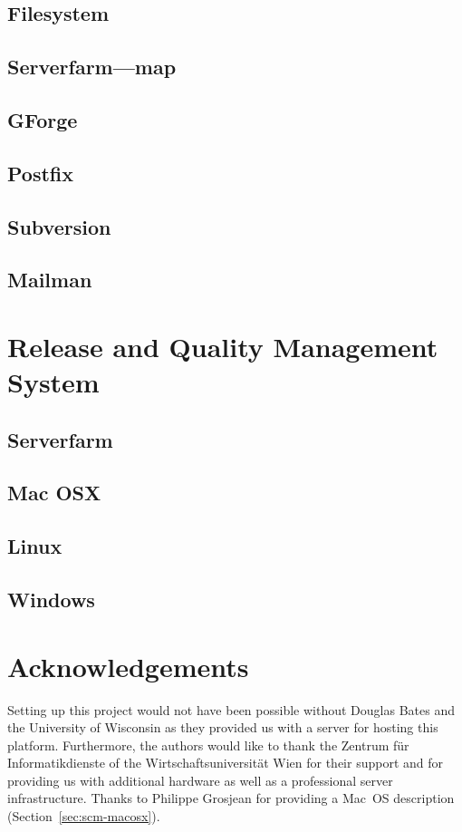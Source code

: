 \documentclass[a4paper]{article}
\begin{document}
\subsection{Filesystem}
\subsection{Serverfarm---map}
\subsection{GForge}
\subsection{Postfix}
\subsection{Subversion}
\subsection{Mailman}

\section{Release and Quality Management System}
\label{sec:release_and_QM}

\subsection{Serverfarm}
\subsection{Mac OSX}
\subsection{Linux}
\subsection{Windows}


\section{Acknowledgements}

Setting up this project would not have been possible without Douglas
Bates and the University of Wisconsin as they provided us with a
server for hosting this platform. Furthermore, 
the authors would like to thank the Zentrum f\"ur Informatikdienste  
of the Wirtschaftsuniversit\"at Wien for
their support and for providing us with additional hardware as well as a
professional server infrastructure. 
Thanks to Philippe Grosjean for
providing a Mac~OS description (Section~\ref{sec:scm-macosx}).



\end{document}
